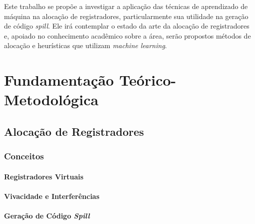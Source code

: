 \documentclass[
	12pt,				%
	openright,			%
	oneside,			%
	a4paper,			%
	tccpreliminar,			%
	]{ABNT-DC-UEL}
\begin{document}
Este trabalho se propõe a investigar a aplicação das técnicas de aprendizado de máquina na alocação de registradores, particularmente sua utilidade na geração de código \textit{spill}. Ele irá contemplar o estado da arte da alocação de registradores e, apoiado no conhecimento acadêmico sobre a área, serão propostos métodos de alocação e heurísticas que utilizam \textit{machine learning}.




% 

\chapter{Fundamentação Teórico-Metodológica}

\section{Alocação de Registradores}

\subsection{Conceitos}

\subsubsection{Registradores Virtuais}

\subsubsection{Vivacidade e Interferências}

\subsubsection{Geração de Código \textit{Spill}}
\end{document}

